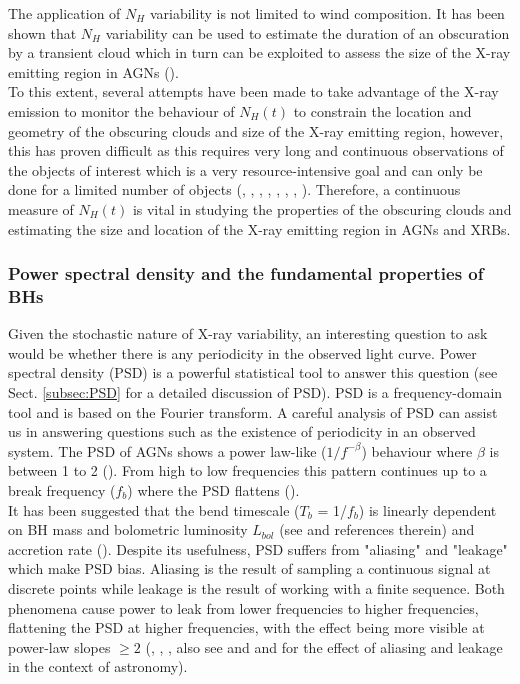 \documentclass{aa}
\begin{document}
The application of $N_H$ variability is not limited to wind composition. It has been shown that $N_H$ variability can be used to estimate the duration of an obscuration by a transient cloud which in turn can be exploited to assess the size of the X-ray emitting region in AGNs (\citealt{Sanfrutos2013}). \\
To this extent, several attempts have been made to take advantage of the X-ray emission to monitor the behaviour of $N_H(t)$ to constrain the location and geometry of the obscuring clouds and size of the X-ray emitting region, however, this has proven difficult as this requires very long and continuous observations of the objects of interest which is a very resource-intensive goal and can only be done for a limited number of objects (\citealt{Risaliti2002}, \citealt{Lamer2003}, \citealt{Maiolino2010}, \citealt{Lefkir2023}, \citealt{Pietrini2024}, \citealt{Pizzetti2025}, \citealt{Tianying2025}, \citealt{Cox2026}). Therefore, a continuous measure of $N_H(t)$ is vital in studying the properties of the obscuring clouds and estimating the size and location of the X-ray emitting region in AGNs and XRBs. \\

\subsubsection{Power spectral density and the fundamental properties of BHs}
\label{sec:psd_BH_properties}
Given the stochastic nature of X-ray variability, an interesting question to ask would be whether there is any periodicity in the observed light curve. Power spectral density (PSD) is a powerful statistical tool to answer this question (see Sect. \ref{subsec:PSD} for a detailed discussion of PSD). PSD is a frequency-domain tool and is based on the Fourier transform. A careful analysis of PSD can assist us in answering questions such as the existence of periodicity in an observed system. The PSD of AGNs shows a power law-like ($1/f^{-\beta}$) behaviour where $\beta$ is between 1 to 2 (\citealt{Press1978}). From high to low frequencies this pattern continues up to a break frequency ($f_b$) where the PSD flattens (\citealt{Kankkunen2025}). \\  
It has been suggested that the bend timescale ($T_b$ = 1/$f_b$) is linearly dependent on BH mass and bolometric luminosity $L_{bol}$ (see \citealt{GonzalezMartinVaughan2012} and references therein) and accretion rate (\citealt{PapadakisBinasValavanis2024}). 
Despite its usefulness, PSD suffers from "aliasing" and "leakage" which make PSD bias. Aliasing is the result of sampling a continuous signal at discrete points while leakage is the result of working with a finite sequence. Both phenomena cause power to leak from lower frequencies to higher frequencies, flattening the PSD at higher frequencies, with the effect being more visible at power-law slopes $\ge 2$ (\citealt{Priestley1981}, \citealt{Kay1988}, \citealt{Hamilton1994}, \citealt{PercivalWalden2020} also see \citealt{Uttley2002} and \citealt{GonzalezMartinVaughan2012} and \citealt{PapadakisBinasValavanis2024} for the effect of aliasing and leakage in the context of astronomy).\\  
\end{document}
